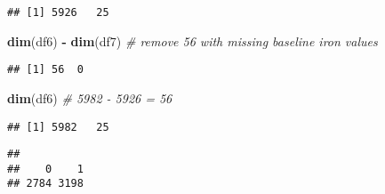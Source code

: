 \documentclass[
]{article}
\newenvironment{Shaded}{\begin{snugshade}}{\end{snugshade}}
\newcommand{\CommentTok}[1]{\textcolor[rgb]{0.56,0.35,0.01}{\textit{#1}}}
\newcommand{\KeywordTok}[1]{\textcolor[rgb]{0.13,0.29,0.53}{\textbf{#1}}}
\newcommand{\NormalTok}[1]{#1}
\newcommand{\OperatorTok}[1]{\textcolor[rgb]{0.81,0.36,0.00}{\textbf{#1}}}
\newcommand{\StringTok}[1]{\textcolor[rgb]{0.31,0.60,0.02}{#1}}
\begin{document}
\begin{verbatim}
## [1] 5926   25
\end{verbatim}

\begin{Shaded}
\begin{Highlighting}[]
\KeywordTok{dim}\NormalTok{(df6) }\OperatorTok{-}\StringTok{ }\KeywordTok{dim}\NormalTok{(df7)  }\CommentTok{# remove 56 with missing baseline iron values}
\end{Highlighting}
\end{Shaded}

\begin{verbatim}
## [1] 56  0
\end{verbatim}

\begin{Shaded}
\begin{Highlighting}[]
\KeywordTok{dim}\NormalTok{(df6)  }\CommentTok{# 5982 - 5926 = 56 }
\end{Highlighting}
\end{Shaded}

\begin{verbatim}
## [1] 5982   25
\end{verbatim}

\begin{Shaded}
\end{Shaded}

\begin{verbatim}
## 
##    0    1 
## 2784 3198
\end{verbatim}

\begin{Shaded}
\end{Shaded}
\end{document}
